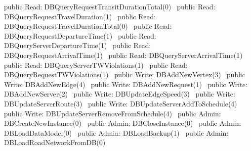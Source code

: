public \LA{}Read: DBQueryRequestTransitDurationTotal(0)~{\nwtagstyle{}}\RA{}
public \LA{}Read: DBQueryRequestTravelDuration(1)~{\nwtagstyle{}}\RA{}
public \LA{}Read: DBQueryRequestTravelDurationTotal(0)~{\nwtagstyle{}}\RA{}
public \LA{}Read: DBQueryRequestDepartureTime(1)~{\nwtagstyle{}}\RA{}
public \LA{}Read: DBQueryServerDepartureTime(1)~{\nwtagstyle{}}\RA{}
public \LA{}Read: DBQueryRequestArrivalTime(1)~{\nwtagstyle{}}\RA{}
public \LA{}Read: DBQueryServerArrivalTime(1)~{\nwtagstyle{}}\RA{}
public \LA{}Read: DBQueryServerTWViolations(1)~{\nwtagstyle{}}\RA{}
public \LA{}Read: DBQueryRequestTWViolations(1)~{\nwtagstyle{}}\RA{}
\nwendcode{}\nwdocspar
{}
\nwenddocs{}\plusendmoddef
public \LA{}Write: DBAddNewVertex(3)~{\nwtagstyle{}}\RA{}
public \LA{}Write: DBAddNewEdge(4)~{\nwtagstyle{}}\RA{}
public \LA{}Write: DBAddNewRequest(1)~{\nwtagstyle{}}\RA{}
public \LA{}Write: DBAddNewServer(2)~{\nwtagstyle{}}\RA{}
public \LA{}Write: DBUpdateEdgeSpeed(3)~{\nwtagstyle{}}\RA{}
public \LA{}Write: DBUpdateServerRoute(3)~{\nwtagstyle{}}\RA{}
public \LA{}Write: DBUpdateServerAddToSchedule(4)~{\nwtagstyle{}}\RA{}
public \LA{}Write: DBUpdateServerRemoveFromSchedule(4)~{\nwtagstyle{}}\RA{}
\nwendcode{}\nwdocspar
{}
\nwenddocs{}\plusendmoddef
public \LA{}Admin: DBCreateNewInstance(0)~{\nwtagstyle{}}\RA{}
public \LA{}Admin: DBCloseInstance(0)~{\nwtagstyle{}}\RA{}
public \LA{}Admin: DBLoadDataModel(0)~{\nwtagstyle{}}\RA{}
public \LA{}Admin: DBLoadBackup(1)~{\nwtagstyle{}}\RA{}
public \LA{}Admin: DBLoadRoadNetworkFromDB(0)~{\nwtagstyle{}}\RA{}
